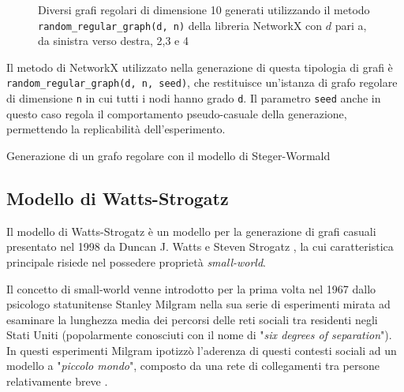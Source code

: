 \begin{figure}[h!]
\begin{subfigure}[b]{0.25\textwidth}
     \end{subfigure}
        \caption{Diversi grafi regolari di dimensione 10 generati utilizzando il metodo \texttt{random\_regular\_graph(d, n)} della libreria NetworkX con $d$ pari a, da sinistra verso destra,  2,3 e 4}
        \label{fig:rrges}
\end{figure}

Il metodo di NetworkX utilizzato nella generazione di questa tipologia di grafi è\\
\texttt{random\_regular\_graph(d, n, seed)}, che restituisce un'istanza di grafo regolare di dimensione \texttt{n} in cui tutti i nodi hanno grado \texttt{d}. Il parametro \texttt{seed} anche in questo caso regola il comportamento pseudo-casuale della generazione, permettendo la replicabilità dell'esperimento.

\newpage
\begin{algorithm}
\SetAlgoLined
{}
 \caption{Generazione di un grafo regolare con il modello di Steger-Wormald}
 \label{alg:rrg}
\end{algorithm}


\subsection{Modello di Watts-Strogatz}
Il modello di Watts-Strogatz è un modello per la generazione di grafi casuali presentato nel 1998 da Duncan J. Watts e Steven Strogatz \cite{watts_collective_1998}, la cui caratteristica principale risiede nel possedere proprietà \textit{small-world}. 

Il concetto di small-world venne introdotto per la prima volta nel 1967 dallo psicologo statunitense Stanley Milgram nella sua serie di esperimenti mirata ad esaminare la lunghezza media dei percorsi delle reti sociali tra residenti negli Stati Uniti (popolarmente conosciuti con il nome di "\textit{six degrees of separation}"). In questi esperimenti Milgram ipotizzò l'aderenza di questi contesti sociali ad un modello a "\textit{piccolo mondo}", composto da una rete di collegamenti tra persone relativamente breve \cite{milgram_small-world_1967}.  

